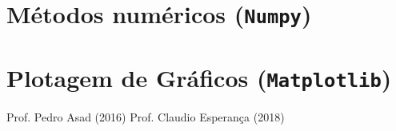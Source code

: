 \documentclass[12pt]{article}
\begin{document}
	
	\section{Métodos numéricos (\texttt{Numpy})}
	
	\section{Plotagem de Gráficos (\texttt{Matplotlib})}
	
	\begin{thebibliography}{99}
	 Prof. Pedro Asad (2016)
	 Prof. Claudio Esperança (2018)
	\end{thebibliography}
\end{document}
